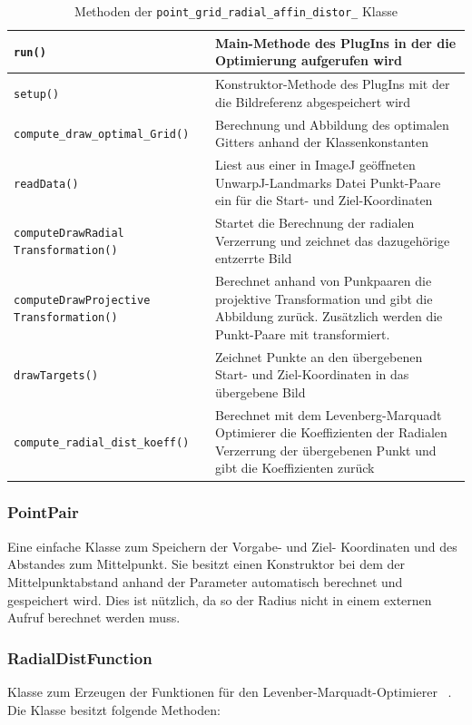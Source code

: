 \begin{table}[H]
	\begin{tabular}{|p{} | p{}|} 
		\hline
		\texttt{run()} & Main-Methode des PlugIns in der die Optimierung aufgerufen wird\\ \hline
		\texttt{setup()} & Konstruktor-Methode des PlugIns mit der die Bildreferenz abgespeichert wird\\ \hline
		\texttt{compute\_draw\_optimal\_Grid()} & Berechnung und Abbildung des optimalen Gitters anhand der Klassenkonstanten \\ \hline
		\texttt{readData()} & Liest aus einer in ImageJ geöffneten UnwarpJ-Landmarks Datei Punkt-Paare ein für die Start- und Ziel-Koordinaten\\\hline
		\texttt{computeDrawRadial Transformation()} & Startet die Berechnung der radialen Verzerrung und zeichnet das dazugehörige entzerrte Bild\\ \hline
		\texttt{computeDrawProjective Transformation()} & Berechnet anhand von Punkpaaren die projektive Transformation und gibt die Abbildung zurück. Zusätzlich werden die Punkt-Paare mit transformiert.\\ \hline
		\texttt{drawTargets()} & Zeichnet Punkte an den übergebenen Start- und Ziel-Koordinaten in das übergebene Bild\\ \hline
		\texttt{compute\_radial\_dist\_koeff()} & Berechnet mit dem Levenberg-Marquadt Optimierer die Koeffizienten der Radialen Verzerrung der übergebenen Punkt und gibt die Koeffizienten zurück\\ 
		\hline
	\end{tabular}
	\caption{Methoden der \texttt{point\_grid\_radial\_affin\_distor\_} Klasse}
\end{table}

\subsubsection{PointPair}
Eine einfache Klasse zum Speichern der Vorgabe- und Ziel- Koordinaten und des Abstandes zum Mittelpunkt. Sie besitzt einen Konstruktor bei dem der Mittelpunktabstand anhand der Parameter automatisch berechnet und gespeichert wird. Dies ist nützlich, da so der Radius nicht in einem externen Aufruf berechnet werden muss.

\subsubsection{RadialDistFunction}
Klasse zum Erzeugen der Funktionen für den Levenber-Marquadt-Optimierer ~\cite{optimizer_example}. Die Klasse besitzt folgende Methoden:

